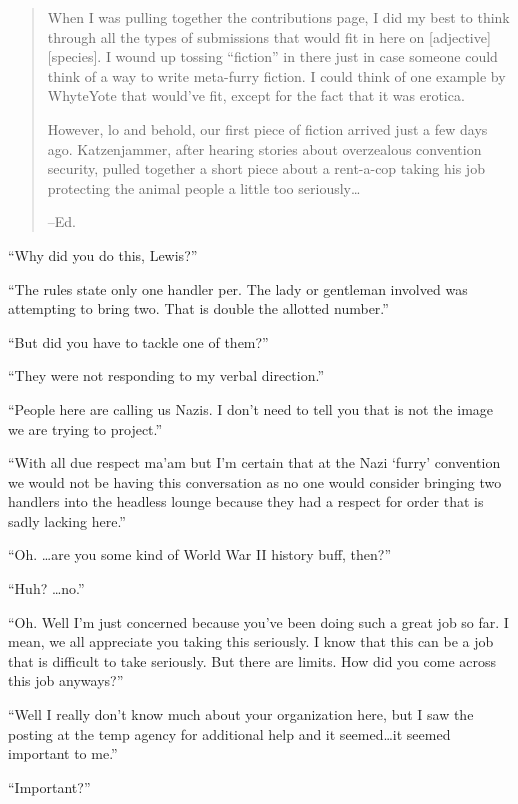 
\begin{quotation}
  When I was pulling together the contributions page, I did my best to think through all the types of submissions that would fit in here on [adjective][species].  I wound up tossing ``fiction'' in there just in case someone could think of a way to write meta-furry fiction.  I could think of one example by WhyteYote that would’ve fit, except for the fact that it was erotica.

  However, lo and behold, our first piece of fiction arrived just a few days ago. Katzenjammer, after hearing stories about overzealous convention security, pulled together a short piece about a rent-a-cop taking his job protecting the animal people a little too seriously\ldots

  --Ed.
\end{quotation}

``Why did you do this, Lewis?''

``The rules state only one handler per. The lady or gentleman involved was attempting to bring two. That is double the allotted number.''

``But did you have to tackle one of them?''

``They were not responding to my verbal direction.''

``People here are calling us Nazis. I don’t need to tell you that is not the image we are trying to project.''

``With all due respect ma’am but I’m certain that at the Nazi ‘furry’ convention we would not be having this conversation as no one would consider bringing two handlers into the headless lounge because they had a respect for order that is sadly lacking here.''

``Oh. \ldots are you some kind of World War II history buff, then?''

``Huh? \ldots no.''

``Oh. Well I’m just concerned because you’ve been doing such a great job so far. I mean, we all appreciate you taking this seriously. I know that this can be a job that is difficult to take seriously. But there are limits. How did you come across this job anyways?''

``Well I really don’t know much about your organization here, but I saw the posting at the temp agency for additional help and it seemed\ldots  it seemed important to me.''

``Important?''

